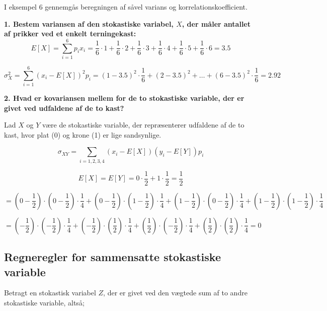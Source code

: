 \documentclass[10pt,reqno, usenames]{article}
\begin{document}
I eksempel 6 gennemgås beregningen af såvel varians og korrelationskoefficient. 

\begin{tcolorbox}[breakable, colback=red!5!white, colframe=red!50!black, title= Eksempel 6: Beregning af varians og korrelationskoefficient]
\textbf{1. Bestem variansen af den stokastiske variabel, $X$, der måler antallet af prikker ved et enkelt terningekast: }
\[
E[X] = \sum_{i=1}^{6} p_i x_i = \frac{1}{6} \cdot 1 + \frac{1}{6} \cdot 2 + \frac{1}{6} \cdot 3 + \frac{1}{6} \cdot 4 + \frac{1}{6} \cdot 5 + \frac{1}{6} \cdot 6 = 3.5
\]

\[
\sigma_X^2 = \sum_{i=1}^{6} (x_i - E[X])^2 p_i = (1 - 3.5)^2 \cdot \frac{1}{6} + (2 - 3.5)^2 + \ldots + (6 - 3.5)^2 \cdot \frac{1}{6} = 2.92
\]

\textbf{2. Hvad er kovariansen mellem for de to stokastiske variable, der er givet ved udfaldene af de to kast?}

\vspace{10 pt}

Lad \( X \) og \( Y \) være de stokastiske variable, der repræsenterer udfaldene af de to kast, hvor plat (0) og krone (1) er lige sandsynlige.

\[
\sigma_{XY} = \sum_{i=1,2,3,4} (x_i - E[X])(y_i - E[Y])p_i
\]

\[
E[X] = E[Y] = 0 \cdot \frac{1}{2} + 1 \cdot \frac{1}{2} = \frac{1}{2}
\]

\[
= \left( 0 - \frac{1}{2} \right) \cdot \left( 0 - \frac{1}{2} \right) \cdot \frac{1}{4} + \left( 0 - \frac{1}{2} \right) \cdot \left( 1 - \frac{1}{2} \right) \cdot \frac{1}{4} + \left( 1 - \frac{1}{2} \right) \cdot \left( 0 - \frac{1}{2} \right) \cdot \frac{1}{4} + \left( 1 - \frac{1}{2} \right) \cdot \left( 1 - \frac{1}{2} \right) \cdot \frac{1}{4}
\]

\[
= \left( -\frac{1}{2} \right) \cdot \left( -\frac{1}{2} \right) \cdot \frac{1}{4} + \left( -\frac{1}{2} \right) \cdot \left( \frac{1}{2} \right) \cdot \frac{1}{4} + \left( \frac{1}{2} \right) \cdot \left( -\frac{1}{2} \right) \cdot \frac{1}{4} + \left( \frac{1}{2} \right) \cdot \left( \frac{1}{2} \right) \cdot \frac{1}{4} = 0
\]
\end{tcolorbox}

\subsection{Regneregler for sammensatte stokastiske variable}
Betragt en stokastisk variabel $Z$, der er givet ved den vægtede sum af to andre stokastiske variable, altså; 
\end{document}
